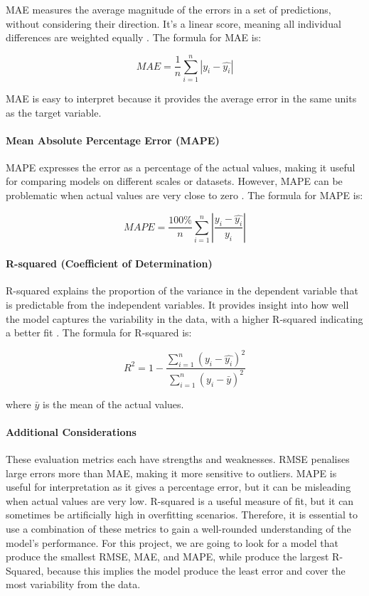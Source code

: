 \documentclass[11pt,a4paper,]{article}
\begin{document}
MAE measures the average magnitude of the errors in a set of predictions, without considering their direction. It's a linear score, meaning all individual differences are weighted equally \autocite{ISLR,Hastie09}. The formula for MAE is:

\[MAE = \frac{1}{n} {\sum^n_{i=1}|y_i-\hat{y_i}|}\]

MAE is easy to interpret because it provides the average error in the same units as the target variable.

\paragraph{Mean Absolute Percentage Error (MAPE)}\label{mean-absolute-percentage-error-mape}

MAPE expresses the error as a percentage of the actual values, making it useful for comparing models on different scales or datasets. However, MAPE can be problematic when actual values are very close to zero \autocite{ISLR,Hastie09}. The formula for MAPE is:

\[MAPE = \frac{100\%}{n} {\sum^n_{i=1}|\frac{y_i-\hat{y_i}}{y_i}|}\]

\paragraph{R-squared (Coefficient of Determination)}\label{r-squared-coefficient-of-determination}

R-squared explains the proportion of the variance in the dependent variable that is predictable from the independent variables. It provides insight into how well the model captures the variability in the data, with a higher R-squared indicating a better fit \autocite{ISLR,Hastie09}. The formula for R-squared is:

\[R^2 = 1-\frac{\sum^n_{i=1}(y_i-\hat{y_i})^2}{\sum^n_{i=1}(y_i-\bar{y})^2}\]

where \(\bar{y}\) is the mean of the actual values.

\paragraph{Additional Considerations}\label{additional-considerations}

These evaluation metrics each have strengths and weaknesses. RMSE penalises large errors more than MAE, making it more sensitive to outliers. MAPE is useful for interpretation as it gives a percentage error, but it can be misleading when actual values are very low. R-squared is a useful measure of fit, but it can sometimes be artificially high in overfitting scenarios. Therefore, it is essential to use a combination of these metrics to gain a well-rounded understanding of the model's performance. For this project, we are going to look for a model that produce the smallest RMSE, MAE, and MAPE, while produce the largest R-Squared, because this implies the model produce the least error and cover the most variability from the data.
\end{document}
